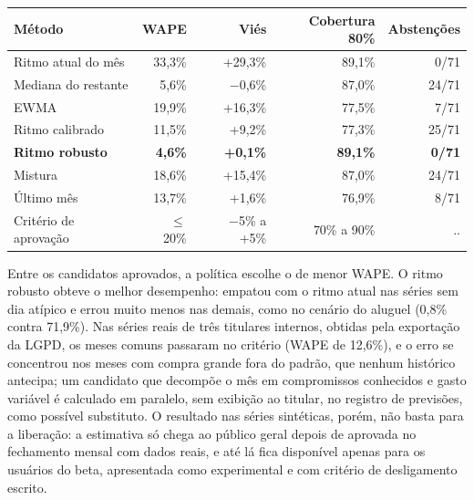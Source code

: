 \begin{tabela}[H]
\centering
\caption{Teste retrospectivo da projeção de fim de mês}
\label{tab:backtest}
{\small
\begin{tabular}{lrrrr}
\toprule
\textbf{Método} & \textbf{WAPE} & \textbf{Viés} & \textbf{Cobertura 80\%} & \textbf{Abstenções} \\
\midrule
Ritmo atual do mês & 33,3\% & +29,3\% & 89,1\% & 0/71 \\
Mediana do restante & 5,6\% & $-$0,6\% & 87,0\% & 24/71 \\
EWMA & 19,9\% & +16,3\% & 77,5\% & 7/71 \\
Ritmo calibrado & 11,5\% & +9,2\% & 77,3\% & 25/71 \\
\textbf{Ritmo robusto} & \textbf{4,6\%} & \textbf{+0,1\%} & \textbf{89,1\%} & \textbf{0/71} \\
Mistura & 18,6\% & +15,4\% & 87,0\% & 24/71 \\
Último mês & 13,7\% & +1,6\% & 76,9\% & 8/71 \\
\midrule
Critério de aprovação & $\leq$ 20\% & $-$5\% a +5\% & 70\% a 90\% & .. \\
\bottomrule
\end{tabular}
}
\authorssource
\end{tabela}

Entre os candidatos aprovados, a política escolhe o de menor WAPE. O ritmo robusto obteve o melhor desempenho: empatou com o ritmo atual nas séries sem dia atípico e errou muito menos nas demais, como no cenário do aluguel (0,8\% contra 71,9\%). Nas séries reais de três titulares internos, obtidas pela exportação da LGPD, os meses comuns passaram no critério (WAPE de 12,6\%), e o erro se concentrou nos meses com compra grande fora do padrão, que nenhum histórico antecipa; um candidato que decompõe o mês em compromissos conhecidos e gasto variável é calculado em paralelo, sem exibição ao titular, no registro de previsões, como possível substituto. O resultado nas séries sintéticas, porém, não basta para a liberação: a estimativa só chega ao público geral depois de aprovada no fechamento mensal com dados reais, e até lá fica disponível apenas para os usuários do beta, apresentada como experimental e com critério de desligamento escrito.

